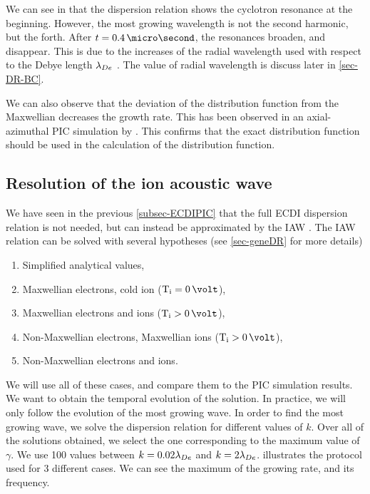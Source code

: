     We can see in  that the dispersion relation shows the cyclotron resonance at the beginning.
    However, the most growing wavelength is not the second harmonic, but the forth.
    After $t=0.4\,\micro\second$, the resonances broaden, and disappear.
    This is due to the increases of the radial wavelength used with respect to the Debye length $\lambda_{De}$ \citep{lafleur2016a,ducrocq2006,cavalier2013}.
    The value of radial wavelength is discuss later in \cref{sec-DR-BC}.
    
    We can also observe that the deviation of the distribution function from the Maxwellian decreases the growth rate.
    This has been observed  in an axial-azimuthal \ac{PIC} simulation by \citet{lafleur2018}.
    This confirms that the exact distribution function should be used in the calculation of the distribution function.
  \FloatBarrier
  \subsection{Resolution of the ion acoustic wave} \label{subsec-VDFIAW}
  
  We have seen in the previous \cref{subsec-ECDIPIC} that the full \ac{ECDI} dispersion relation is not needed, but can instead be approximated by the \ac{IAW} \citep{lafleur2018,janhunen2018,taccogna2019}.
  The \ac{IAW} relation can be solved with several hypotheses (see \cref{sec-geneDR} for more details)
  \begin{enumerate}
    \item Simplified analytical values,
    \item Maxwellian electrons, cold ion ($\Ti = 0\,\volt$),
    \item Maxwellian electrons and ions ($\Ti > 0\,\volt$),
    \item Non-Maxwellian electrons, Maxwellian ions ($\Ti > 0\,\volt$),
    \item Non-Maxwellian electrons and ions.
  \end{enumerate}
  
  We will use all of these cases, and compare them to the \ac{PIC} simulation results.
  We want to obtain the temporal evolution of the solution.
  In practice, we will only follow the evolution of the most growing wave.
  In order to find the most growing wave, we solve the dispersion relation for different values of $k$.
  Over all of the solutions obtained, we select the one corresponding to the maximum value of $\gamma$.
  We use 100 values between $k=0.02 \lambda_{De}$ and $k = 2 \lambda_{De}$.
   illustrates the protocol used for 3 different cases.
  We can see the maximum of the growing rate, and its frequency.
  
